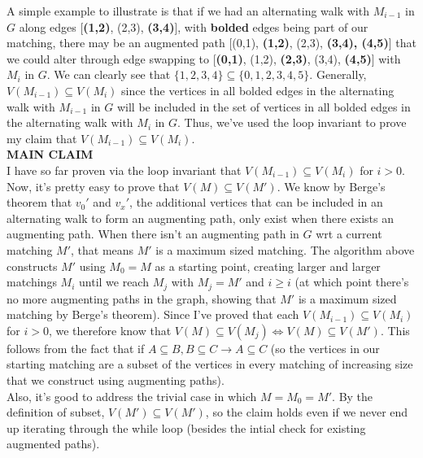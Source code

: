 \documentclass[11pt]{article}
\begin{document}
\begin{enumerate}
\begin{enumerate}
            A simple example to illustrate is that if we had an alternating walk with $M_{i-1}$ in $G$ along edges [\textbf{(1,2)}, (2,3), \textbf{(3,4)}], with \textbf{bolded} edges being part of our matching, there may be an augmented path [(0,1), \textbf{(1,2)}, (2,3), \textbf{(3,4), (4,5)}] that we could alter through edge swapping to [\textbf{(0,1)}, (1,2), \textbf{(2,3)}, (3,4), \textbf{(4,5)}] with $M_i$ in $G$. We can clearly see that $\{ 1,2,3,4 \} \subseteq \{0,1,2,3,4,5\}$. Generally, $V(M_{i-1}) \subseteq V(M_i)$ since the vertices in all bolded edges in the alternating walk with $M_{i-1}$ in $G$ will be included in the set of vertices in all bolded edges in the alternating walk with $M_{i}$ in $G$. Thus, we've used the loop invariant to prove my claim that $V(M_{i-1}) \subseteq V(M_i)$. \\
            
            \textbf{MAIN CLAIM} \\

            I have so far proven via the loop invariant that $V(M_{i-1}) \subseteq V(M_i)$ for $i > 0$. Now, it's pretty easy to prove that $V(M)\subseteq V(M')$. We know by Berge's theorem that $v_0'$ and $v_x'$, the additional vertices that can be included in an alternating walk to form an augmenting path, only exist when there exists an augmenting path. When there isn't an augmenting path in $G$ wrt a current matching $M'$, that means $M'$ is a maximum sized matching. The algorithm above constructs $M'$ using $M_0 = M$ as a starting point, creating larger and larger matchings $M_i$ until we reach $M_j$ with $M_j = M'$ and $i \geq i$ (at which point there's no more augmenting paths in the graph, showing that $M'$ is a maximum sized matching by Berge's theorem). Since I've proved that each $V(M_{i-1}) \subseteq V(M_i)$ for $i > 0$, we therefore know that $V(M) \subseteq V(M_j) \Leftrightarrow V(M) \subseteq V(M')$. This follows from the fact that if $A \subseteq B, B \subseteq C \rightarrow A \subseteq C$ (so the vertices in our starting matching are a subset of the vertices in every matching of increasing size that we construct using augmenting paths). \\

            Also, it's good to address the trivial case in which $M = M_0 = M'$. By the definition of subset, $V(M') \subseteq V(M')$, so the claim holds even if we never end up iterating through the while loop (besides the intial check for existing augmented paths). \\
            

\end{enumerate}
\end{enumerate}
\end{document}
